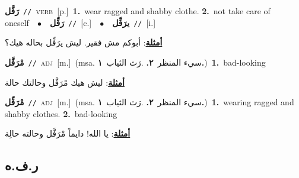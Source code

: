 \documentclass[10pt,a4paper,twoside]{article} %
\begin{document}
\begin{multicols}{2}
{\setlength\topsep{0pt}\textbf{\foreignlanguage{arabic}{رَفَّل}}\ {\color{gray}\texttt{//}\color{black}}\ \textsc{verb}\ [p.]\ \textbf{1.}~wear ragged and shabby clothe.  \textbf{2.}~not take care of oneself\ \ $\bullet$\ \ \setlength\topsep{0pt}\textbf{\foreignlanguage{arabic}{رَفِّل}}\ {\color{gray}\texttt{//}\color{black}}\ [c.]\ \ $\bullet$\ \ \setlength\topsep{0pt}\textbf{\foreignlanguage{arabic}{يرَفِّل}}\ {\color{gray}\texttt{//}\color{black}}\ [i.]\  \begin{flushright}\color{gray}\foreignlanguage{arabic}{\textbf{\underline{\foreignlanguage{arabic}{أمثلة}}}: أبوكم مش فقير. ليش يرَفِّل بحاله هيك؟}\end{flushright}\color{black}} \vspace{2mm}

{\setlength\topsep{0pt}\textbf{\foreignlanguage{arabic}{مْرَفَّل}}\ {\color{gray}\texttt{//}\color{black}}\ \textsc{adj}\ [m.]\ \color{gray}(msa. \foreignlanguage{arabic}{سيء المنظر}~\foreignlanguage{arabic}{\textbf{٢.}}  .\foreignlanguage{arabic}{رَث الثياب}~\foreignlanguage{arabic}{\textbf{١.}})\color{black}\ \textbf{1.}~bad-looking\  \begin{flushright}\color{gray}\foreignlanguage{arabic}{\textbf{\underline{\foreignlanguage{arabic}{أمثلة}}}: ليش هيك مْرَفَّل وحالتك حالة}\end{flushright}\color{black}} \vspace{2mm}

{\setlength\topsep{0pt}\textbf{\foreignlanguage{arabic}{مْرَفِّل}}\ {\color{gray}\texttt{//}\color{black}}\ \textsc{adj}\ [m.]\ \color{gray}(msa. \foreignlanguage{arabic}{سيء المنظر}~\foreignlanguage{arabic}{\textbf{٢.}}  .\foreignlanguage{arabic}{رَث الثياب}~\foreignlanguage{arabic}{\textbf{١.}})\color{black}\ \textbf{1.}~wearing ragged and shabby clothes.  \textbf{2.}~bad-looking\  \begin{flushright}\color{gray}\foreignlanguage{arabic}{\textbf{\underline{\foreignlanguage{arabic}{أمثلة}}}: يا الله! دايماً مْرَفَّل وحالته حالِة}\end{flushright}\color{black}} \vspace{2mm}

\vspace{-3mm}
\subsection*{\color{blue}\foreignlanguage{arabic}{ر.ف.ه}\color{blue}{}} 


\end{multicols}
\end{document}
